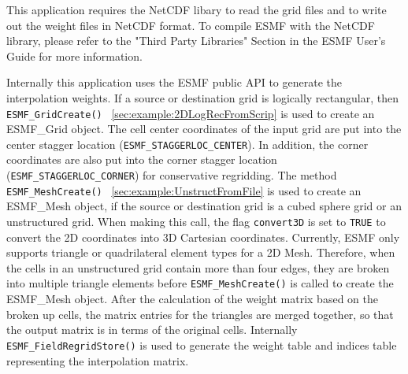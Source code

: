 This application requires the NetCDF libary to read the grid files and to write out the weight files in NetCDF format.  To compile ESMF with
the NetCDF library, please refer to the "Third Party Libraries" Section in the ESMF User's Guide for more information.

Internally this application uses the ESMF public API to generate the interpolation weights.
If a source or destination grid is logically rectangular, then {\tt ESMF\_GridCreate()}
~\ref{sec:example:2DLogRecFromScrip} 
is used to create an ESMF\_Grid object. The cell center 
coordinates of the input grid are put into the center stagger location ({\tt ESMF\_STAGGERLOC\_CENTER}). 
In addition, the corner coordinates are also put into the corner stagger location 
({\tt ESMF\_STAGGERLOC\_CORNER}) for conservative regridding.  The method
{\tt ESMF\_MeshCreate()}
~\ref{sec:example:UnstructFromFile} 
is used to create an ESMF\_Mesh object, if the 
source or destination grid is a cubed sphere grid or an unstructured grid. When making this call, 
the flag {\tt convert3D} is set to {\tt TRUE} to convert the 2D coordinates into 3D Cartesian coordinates. Currently, ESMF only supports
triangle or quadrilateral element types for a 2D Mesh.  Therefore, when the cells in an unstructured grid contain more than four edges, they are broken into multiple triangle elements before {\tt ESMF\_MeshCreate()} is called to create the ESMF\_Mesh object. After the calculation of the weight matrix based on the broken up
cells, the matrix entries for the triangles are merged together, so that the output matrix is in terms of the original cells.  
Internally {\tt ESMF\_FieldRegridStore()} is used to generate the weight table and indices table representing the interpolation matrix. 

